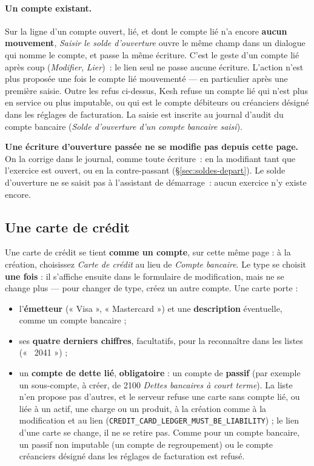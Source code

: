 \documentclass[a4paper,11pt,oneside]{article}
\begin{document}
\paragraph{Un compte existant.} Sur la ligne d'un compte ouvert, lié, et dont le compte lié n'a encore \textbf{aucun mouvement}, \emph{Saisir le solde d'ouverture} ouvre le même champ dans un dialogue qui nomme le compte, et passe la même écriture. C'est le geste d'un compte lié après coup (\emph{Modifier}, \emph{Lier})~: le lien seul ne passe aucune écriture. L'action n'est plus proposée une fois le compte lié mouvementé --- en particulier après une première saisie. Outre les refus ci-dessus, Kesh refuse un compte lié qui n'est plus en service ou plus imputable, ou qui est le compte débiteurs ou créanciers désigné dans les réglages de facturation. La saisie est inscrite au journal d'audit du compte bancaire (\emph{Solde d'ouverture d'un compte bancaire saisi}).

\begin{keshnote}
\textbf{Une écriture d'ouverture passée ne se modifie pas depuis cette page.} On la corrige dans le journal, comme toute écriture~: en la modifiant tant que l'exercice est ouvert, ou en la contre-passant (\S\ref{sec:soldes-depart}). Le solde d'ouverture ne se saisit pas à l'assistant de démarrage~: aucun exercice n'y existe encore.
\end{keshnote}

\subsection{Une carte de crédit}\label{sec:carte-credit}

Une carte de crédit se tient \textbf{comme un compte}, sur cette même page : à la création, choisissez \emph{Carte de crédit} au lieu de \emph{Compte bancaire}. Le type se choisit \textbf{une fois} : il s'affiche ensuite dans le formulaire de modification, mais ne se change plus --- pour changer de type, créez un autre compte. Une carte porte :

\begin{itemize}
    \item l'\textbf{émetteur} (« Visa », « Mastercard ») et une \textbf{description} éventuelle, comme un compte bancaire ;
    \item ses \textbf{quatre derniers chiffres}, facultatifs, pour la reconnaître dans les listes (« \textbullet\textbullet\textbullet\textbullet~2041 ») ;
    \item un \textbf{compte de dette lié}, \textbf{obligatoire} : un compte de \textbf{passif} (par exemple un sous-compte, à créer, de 2100 \emph{Dettes bancaires à court terme}). La liste n'en propose pas d'autres, et le serveur refuse une carte sans compte lié, ou liée à un actif, une charge ou un produit, à la création comme à la modification et au lien (\texttt{CREDIT\_CARD\_LEDGER\_\allowbreak MUST\_BE\_LIABILITY}) ; le lien d'une carte se change, il ne se retire pas. Comme pour un compte bancaire, un passif non imputable (un compte de regroupement) ou le compte créanciers désigné dans les réglages de facturation est refusé.
\end{itemize}
\end{document}
